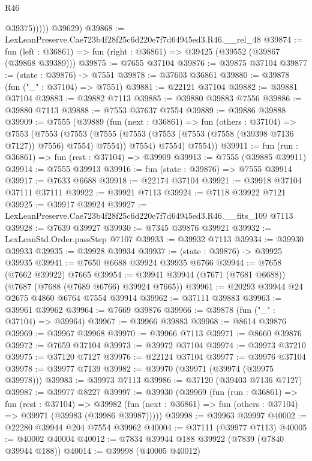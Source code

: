 \begin{lexlean}{R46}
\begin{coremodule}
                @39375)))))
      @39629)
@39868 := LexLeanPreserve.Cae723b4f28f25c6d220e7f7d64945ed3.R46.__rel_48
@39874 := fun (left : @36861) => fun (right : @36861) => @39425 (@39552 (@39867 (@39868 @39389)))
@39875 := @7655 @37104
@39876 := @39875 @37104
@39877 := (state : @39876) -> @7551
@39878 := @37603 @36861
@39880 := @39878 (fun ("_" : @37104) => @7551)
@39881 := @22121 @37104
@39882 := @39881 @37104
@39883 := @39882 @7113
@39885 := @39880 @39883 @7556
@39886 := @39880 @7113
@39888 := @7553 @37637 @7554
@39889 := @39886 @39888
@39909 := @7555
    (@39889
      (fun (next : @36861) =>
      fun (others : @37104) =>
      @7553
        (@7553
          (@7553
            (@7555 (@7553 (@7553 (@7553 (@7558 (@39398 @7136 @7127)) @7556) @7554) @7554))
            @7554)
          @7554)
        @7554))
@39911 := fun (run : @36861) => fun (rest : @37104) => @39909
@39913 := @7555 (@39885 @39911)
@39914 := @7555 @39913
@39916 := fun (state : @39876) => @7555 @39914
@39917 := @7633 @6688
@39918 := @22174 @37104
@39921 := @39918 @37104 @37111 @37111
@39922 := @39921 @7113
@39924 := @7118 @39922 @7121
@39925 := @39917 @39924
@39927 := LexLeanPreserve.Cae723b4f28f25c6d220e7f7d64945ed3.R46.__fits_109 @7113
@39928 := @7639 @39927
@39930 := @7345 @39876 @39921
@39932 := LexLeanStd.Order.passStep @7107
@39933 := @39932 @7113
@39934 := @39930 @39933
@39935 := @39928 @39934
@39937 := (state : @39876) -> @39925 @39935
@39941 := @7650 @6688 @39924 @39935 @6766
@39944 := @7658 (@7662 @39922) @7665
@39954 := @39941 @39944 (@7671 (@7681 @6688)) (@7687 (@7688 (@7689 @6766) @39924 @7665))
@39961 := @20293 @39944 @24 @2675 @4860 @6764 @7554 @39914
@39962 := @37111 @39883
@39963 := @39961 @39962
@39964 := @7669 @39876
@39966 := @39878 (fun ("_" : @37104) => @39964)
@39967 := @39966 @39883
@39968 := @8614 @39876
@39969 := @39967 @39968
@39970 := @39966 @7113
@39971 := @8660 @39876
@39972 := @7659 @37104
@39973 := @39972 @37104
@39974 := @39973 @37210
@39975 := @37120 @7127
@39976 := @22124 @37104
@39977 := @39976 @37104
@39978 := @39977 @7139
@39982 := @39970 (@39971 (@39974 (@39975 @39978)))
@39983 := @39973 @7113
@39986 := @37120 (@39403 @7136 @7127)
@39987 := @39977 @8227
@39997 := @39930
    (@39969
      (fun (run : @36861) =>
      fun (rest : @37104) =>
      @39982 (fun (next : @36861) => fun (others : @37104) => @39971 (@39983 (@39986 @39987)))))
@39998 := @39963 @39997
@40002 := @22280 @39944 @204 @7554 @39962
@40004 := @37111 (@39977 @7113)
@40005 := @40002 @40004
@40012 := @7834 @39944 @188 @39922 (@7839 (@7840 @39944 @188))
@40014 := @39998 (@40005 @40012)

\end{coremodule}
\end{lexlean}
